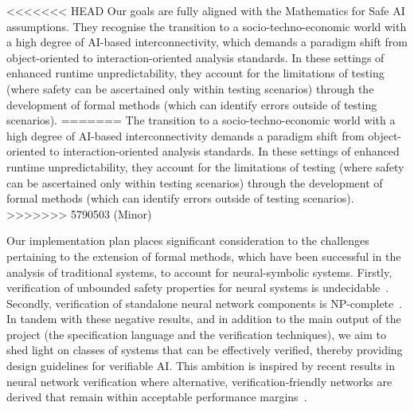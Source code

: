 \documentclass[11pt]{article}
\begin{document}
<<<<<<< HEAD
Our goals are fully aligned with the Mathematics for Safe AI
assumptions.  They recognise the transition to a
socio-techno-economic world with a high degree of AI-based
interconnectivity, which demands a paradigm shift from object-oriented
to interaction-oriented analysis standards. In
these settings of enhanced runtime unpredictability, they
account for the limitations of testing (where safety can be
ascertained only within testing scenarios) through the
development of formal methods (which can identify errors
outside of testing scenarios). 
=======
The transition to a socio-techno-economic world with a high degree of AI-based
interconnectivity demands a paradigm shift from object-oriented to
interaction-oriented analysis standards. In these settings of enhanced runtime
unpredictability, they account for the limitations of testing (where safety can
be ascertained only within testing scenarios) through the development of formal
methods (which can identify errors outside of testing scenarios).
>>>>>>> 5790503 (Minor)

Our implementation plan  places significant consideration to the challenges
pertaining to the extension of formal methods, which have been successful in the
analysis of traditional systems, to account for neural-symbolic systems.
Firstly, verification of unbounded safety properties for neural systems is
undecidable~\cite{Akintunde+20}. Secondly, verification of standalone neural
network components is NP-complete~\cite{Katz+17}. In tandem with these negative
results, and in addition to the main output of the project (the specification
language and the verification techniques), we aim to shed light on classes of
systems that can be effectively verified, thereby providing design guidelines
for verifiable AI. This ambition is inspired by recent results in neural network
verification where alternative, verification-friendly networks are derived that
remain within acceptable performance margins~\cite{baninajjarvnn}.


  

\end{document}
